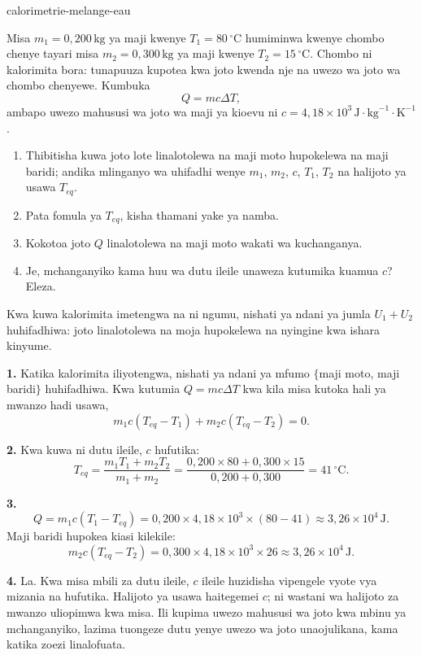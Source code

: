 \begin{exo}{calorimetrie-melange-eau}

Misa $m_1=0{,}200\,\text{kg}$ ya maji kwenye $T_1=80\,{}^\circ\text{C}$ humiminwa kwenye chombo chenye tayari misa $m_2=0{,}300\,\text{kg}$ ya maji kwenye $T_2=15\,{}^\circ\text{C}$. Chombo ni kalorimita bora: tunapuuza kupotea kwa joto kwenda nje na uwezo wa joto wa chombo chenyewe. Kumbuka
\[
Q=mc\Delta T,
\]
ambapo uwezo mahususi wa joto wa maji ya kioevu ni $c=4{,}18\times10^3\,\text{J}\!\cdot\!\text{kg}^{-1}\!\cdot\!\text{K}^{-1}$.

\begin{enumerate}
  \item Thibitisha kuwa joto lote linalotolewa na maji moto hupokelewa na maji baridi; andika mlinganyo wa uhifadhi wenye $m_1$, $m_2$, $c$, $T_1$, $T_2$ na halijoto ya usawa $T_{eq}$.
  \item Pata fomula ya $T_{eq}$, kisha thamani yake ya namba.
  \item Kokotoa joto $Q$ linalotolewa na maji moto wakati wa kuchanganya.
  \item Je, mchanganyiko kama huu wa dutu ileile unaweza kutumika kuamua $c$? Eleza.
\end{enumerate}

\begin{indication}
Kwa kuwa kalorimita imetengwa na ni ngumu, nishati ya ndani ya jumla $U_1+U_2$ huhifadhiwa: joto linalotolewa na moja hupokelewa na nyingine kwa ishara kinyume.
\end{indication}

\begin{solution}
\textbf{1.} Katika kalorimita iliyotengwa, nishati ya ndani ya mfumo $\{$maji moto, maji baridi$\}$ huhifadhiwa. Kwa kutumia $Q=mc\Delta T$ kwa kila misa kutoka hali ya mwanzo hadi usawa,
\[
m_1c(T_{eq}-T_1)+m_2c(T_{eq}-T_2)=0.
\]

\textbf{2.} Kwa kuwa ni dutu ileile, $c$ hufutika:
\[
T_{eq}=\frac{m_1T_1+m_2T_2}{m_1+m_2}
=\frac{0{,}200\times80+0{,}300\times15}{0{,}200+0{,}300}
=41\,{}^\circ\text{C}.
\]

\textbf{3.}
\[
Q=m_1c(T_1-T_{eq})
=0{,}200\times4{,}18\times10^3\times(80-41)
\approx3{,}26\times10^4\,\text{J}.
\]
Maji baridi hupokea kiasi kilekile:
\[
m_2c(T_{eq}-T_2)=0{,}300\times4{,}18\times10^3\times26\approx3{,}26\times10^4\,\text{J}.
\]

\textbf{4.} La. Kwa misa mbili za dutu ileile, $c$ ileile huzidisha vipengele vyote vya mizania na hufutika. Halijoto ya usawa haitegemei $c$; ni wastani wa halijoto za mwanzo uliopimwa kwa misa. Ili kupima uwezo mahususi wa joto kwa mbinu ya mchanganyiko, lazima tuongeze dutu yenye uwezo wa joto unaojulikana, kama katika zoezi linalofuata.
\end{solution}
\end{exo}

